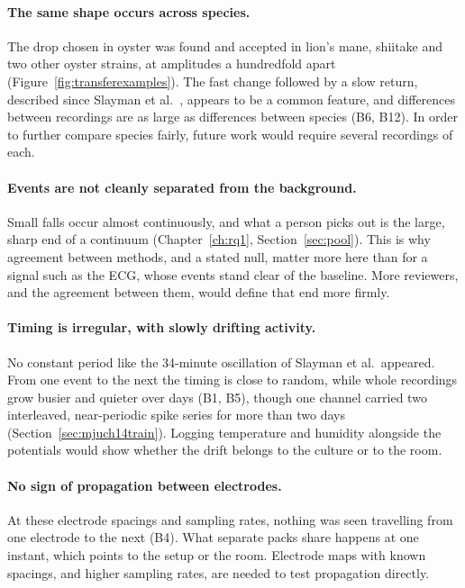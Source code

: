 \paragraph{The same shape occurs across species.} The drop chosen in oyster was found and accepted in lion's mane, shiitake and two other oyster strains, at amplitudes a hundredfold apart (Figure~\ref{fig:transferexamples}). The fast change followed by a slow return, described since Slayman et al.\ \cite{slayman}, appears to be a common feature, and differences between recordings are as large as differences between species (B6, B12). In order to further compare species fairly, future work would require several recordings of each.

\paragraph{Events are not cleanly separated from the background.} Small falls occur almost continuously, and what a person picks out is the large, sharp end of a continuum (Chapter~\ref{ch:rq1}, Section~\ref{sec:pool}). This is why agreement between methods, and a stated null, matter more here than for a signal such as the ECG, whose events stand clear of the baseline. More reviewers, and the agreement between them, would define that end more firmly.

\paragraph{Timing is irregular, with slowly drifting activity.} No constant period like the 34-minute oscillation of Slayman et al.\ appeared. From one event to the next the timing is close to random, while whole recordings grow busier and quieter over days (B1, B5), though one channel carried two interleaved, near-periodic spike series for more than two days (Section~\ref{sec:mjuch14train}). Logging temperature and humidity alongside the potentials would show whether the drift belongs to the culture or to the room.

\paragraph{No sign of propagation between electrodes.} At these electrode spacings and sampling rates, nothing was seen travelling from one electrode to the next (B4). What separate packs share happens at one instant, which points to the setup or the room. Electrode maps with known spacings, and higher sampling rates, are needed to test propagation directly.

